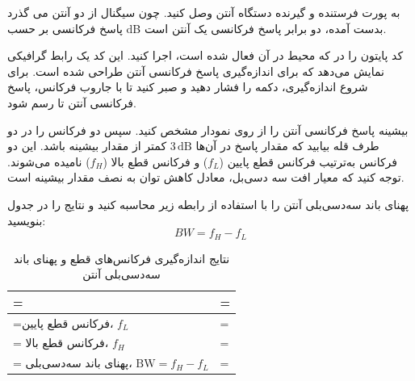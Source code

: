 \documentclass[a4paper,11pt]{article}
\begin{document}
\begin{steps}
\item به پورت فرستنده و گیرنده دستگاه آنتن وصل کنید. چون سیگنال از دو آنتن می گذرد پاسخ فرکانسی بر حسب 
dB
بدست آمده، دو برابر پاسخ فرکانسی یک آنتن است. 
\item	کد پایتون
	را در
	که محیط
	در آن فعال شده است، اجرا کنید. این کد یک رابط گرافیکی نمایش می‌دهد که برای اندازه‌گیری پاسخ فرکانسی آنتن طراحی شده است. برای شروع اندازه‌گیری، دکمه
	را فشار دهید و صبر کنید تا با جاروب فرکانس، پاسخ فرکانسی آنتن تا
	رسم شود.

\item	بیشینه پاسخ فرکانسی آنتن را از روی نمودار مشخص کنید. سپس دو فرکانس را در دو طرف قله بیابید که مقدار پاسخ در آن‌ها
	$3\,\mathrm{dB}$
	کمتر از مقدار بیشینه باشد. این دو فرکانس به‌ترتیب فرکانس قطع پایین
	($f_L$)
	و فرکانس قطع بالا
	($f_H$)
	نامیده می‌شوند. توجه کنید که معیار افت سه دسی‌بل، معادل کاهش توان به نصف مقدار بیشینه است.

	پهنای باند سه‌دسی‌بلی آنتن را با استفاده از رابطه زیر محاسبه کنید و نتایج را در جدول بنویسید:
	\[
		BW = f_H - f_L
	\]
	\begin{table}[H]
	\centering\small
	\caption{نتایج اندازه‌گیری فرکانس‌های قطع و پهنای باند سه‌دسی‌بلی آنتن}
	\label{tab:antenna_bandwidth}
	\begin{tabularx}{\linewidth}{|>{\hsize=0.9\hsize\linewidth=\hsize}X|>{\hsize=1.1\hsize\linewidth=\hsize}X|}
		\hline
		\hdrrow \hdr{کمیت} & \hdr{مقدار بر حسب $\mathrm{MHz}$} \\ \hline
		فرکانس قطع پایین، $f_L$ & \rowstrut \\ \hline
		فرکانس قطع بالا، $f_H$ & \rowstrut \\ \hline
		پهنای باند سه‌دسی‌بلی، $\mathrm{BW} = f_H - f_L$ & \rowstrut \\ \hline
	\end{tabularx}
\end{table}
\end{steps}
\end{document}
